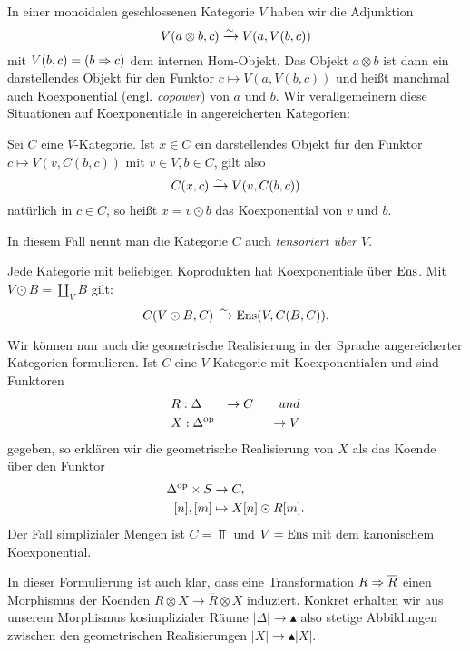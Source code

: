 In einer monoidalen geschlossenen Kategorie $V$ haben wir die Adjunktion
\[ V(a \otimes b, c) \xrightarrow[]{\sim} V(a, V(b, c)) \]
mit $V(b, c) = (b \Rightarrow c)$ dem internen Hom-Objekt. Das Objekt $a
\otimes b$ ist dann ein darstellendes Objekt für den Funktor $c
\mapsto V(a, V(b, c))$ und heißt manchmal auch Koexponential
(engl. \emph{copower}) von $a$ und $b$. Wir verallgemeinern diese
Situationen auf Koexponentiale in angereicherten Kategorien:
\begin{defn} \label{copower}
  Sei $C$ eine $V$-Kategorie. Ist $x \in C$ ein darstellendes Objekt
  für den Funktor $c \mapsto V(v, C(b, c))$ mit $v \in V, b \in C$,
  gilt also
  \[ C(x, c) \xrightarrow[]{\sim} V(v, C(b, c)) \]
  natürlich in $c \in C$, so heißt $x = v \odot b$ das Koexponential
  von $v$ und $b$.  
\end{defn}
In diesem Fall nennt man die Kategorie $C$ auch \emph{tensoriert über
  $V$}.
\begin{bsp} \label{ens-tensored}
  Jede Kategorie mit beliebigen Koprodukten hat Koexponentiale über
  $\operatorname{Ens}$. Mit $V \odot B = \coprod_V B$ gilt:
  \[ C(V \odot B, C) \xrightarrow[]{\sim} \operatorname{Ens}(V, C(B, C)). \]
\end{bsp}

Wir können nun auch die geometrische Realisierung in der Sprache
angereicherter Kategorien formulieren. Ist $C$ eine $V$-Kategorie mit
Koexponentialen und sind Funktoren
\begin{align*}
  &R: \Delta &\to C \qquad{und} \\
  &X: \Delta^\mathrm{op} &\to V
\end{align*}
gegeben, so erklären wir die geometrische Realisierung von $X$ als das
Koende über den Funktor
\begin{align*}
  \Delta^\mathrm{op} \times S &\to C, \\
  [n], [m] &\mapsto X[n] \odot R[m].
\end{align*}
Der Fall simplizialer Mengen ist $C = \Top$ und $V = \operatorname{Ens}$ mit dem
kanonischem Koexponential.

\begin{bem} \label{real-model-natural}
  In dieser Formulierung ist auch klar, dass eine Transformation $R
  \Rightarrow \overline{R}$ einen Morphismus der Koenden $R \otimes X \to
  \overline{R} \otimes X$ induziert. Konkret erhalten wir aus unserem
  Morphismus kosimplizialer Räume $|\Delta| \to \blacktriangle$ also
  stetige Abbildungen zwischen den geometrischen Realisierungen $|X|
  \to \blacktriangle |X|$.
\end{bem}



